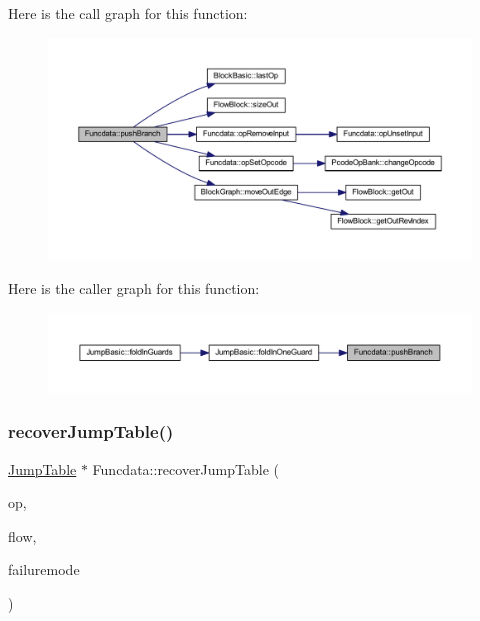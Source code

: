 Here is the call graph for this function\+:
\nopagebreak
\begin{figure}[H]
\begin{center}
\leavevmode
\includegraphics[width=350pt]{class_funcdata_aa2d635570305e3ea710ade3cf090ba8c_cgraph}
\end{center}
\end{figure}
Here is the caller graph for this function\+:
\nopagebreak
\begin{figure}[H]
\begin{center}
\leavevmode
\includegraphics[width=350pt]{class_funcdata_aa2d635570305e3ea710ade3cf090ba8c_icgraph}
\end{center}
\end{figure}
\mbox{\label{class_funcdata_a38d58c33cdc77c663fceb7de1f6aadeb}} 
\subsubsection{\texorpdfstring{recoverJumpTable()}{recoverJumpTable()}}
{\footnotesize\ttfamily \mbox{\hyperlink{class_jump_table}{Jump\+Table}} $\ast$ Funcdata\+::recover\+Jump\+Table (\begin{DoxyParamCaption}\item[{\mbox{\hyperlink{class_pcode_op}{Pcode\+Op}} $\ast$}]{op,  }\item[{\mbox{\hyperlink{class_flow_info}{Flow\+Info}} $\ast$}]{flow,  }\item[{int4 \&}]{failuremode }\end{DoxyParamCaption})}



